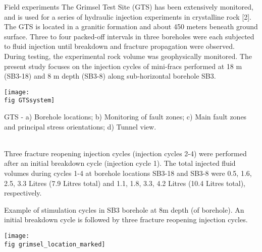 \documentclass[final,t, 6pt]{beamer}
\begin{document}
\begin{frame}{}
\begin{columns}[t]
\begin{column}{.48\linewidth}
  \begin{block}{Field experiments}
    The Grimsel Test Site (GTS) has been extensively monitored, and is used for a series of \alert{hydraulic injection experiments} in \alert{crystalline rock} [2]. 
    The GTS is located in a granitic formation and about 450 meters beneath ground surface. 
    Three to four packed-off intervals in \alert{three boreholes} were each subjected to fluid injection until breakdown and fracture propagation were observed. 
    During testing, the experimental rock volume was geophysically monitored. 
    The present study focuses on the injection cycles of mini-fracs performed at 18 m (SB3-18) and 8 m depth (SB3-8) along sub-horizontal borehole SB3.\\[15pt]
    \begin{minipage}{0.99\textwidth}
      \begin{minipage}{0.6\textwidth}
	\begin{center}
	  \texttt{[image: \\fig GTSsystem]}
	\end{center}
      \end{minipage}
      \begin{minipage}{0.35\textwidth}
	{\small {} GTS - a) Borehole locations; b) Monitoring of fault zones; c) Main fault zones and principal stress orientations; d) Tunnel view.}
      \end{minipage}
    \end{minipage}\\[15pt]
  
    Three \alert{fracture reopening injection cycles} (injection cycles 2-4) were performed after an \alert{initial breakdown cycle} (injection cycle 1). The \alert{total injected fluid volumes} during cycles 1-4 at borehole locations SB3-18 and SB3-8 were 0.5, 1.6, 2.5, 3.3 Litres (7.9 Litres total) and 1.1, 1.8, 3.3, 4.2 Litres (10.4 Litres total), respectively. \\[5pt]
    \begin{minipage}{0.99\textwidth}
      \begin{minipage}{0.35\textwidth}
	{\small {} Example of stimulation cycles in SB3 borehole at 8m depth (of borehole). An initial breakdown cycle is followed by three fracture reopening injection cycles.}
      \end{minipage}
      \begin{minipage}{0.6\textwidth}
	\begin{center}
	  \texttt{[image: \\fig grimsel\_location\_marked]}
	\end{center}
      \end{minipage}
    \end{minipage}
    

\end{block}
\end{column}
\end{columns}
\end{frame}
\end{document}
